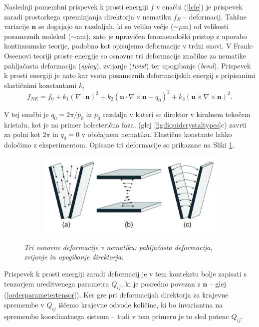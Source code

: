 \documentclass[longbibliography,slovene,a4paper,12pt]{book}
\begin{document}
Naslednji pomembni prispevek k prosti energiji $f$ v enačbi (\ref{lcfe}) je prispevek zaradi prostorkega spreminjanja direktorja v nematiku $f_{E}$ -- deformacij. Takšne variacije $\mathbf{n}$ se dogajajo na razdaljah, ki so veliko večje ($\sim \mu$m) od velikosti posameznih molekul ($\sim $nm), zato je upravičen fenomenološki pristop z uporabo kontinuumske teorije, podobno kot opisujemo deformacije v trdni snovi. V Frank-Oseenovi teoriji proste energije so osnovne tri deformacije značilne za nematike  pahljačasta deformacija (\emph{splay}), zvijanje (\emph{twist}) ter upogibanje (\emph{bend}). Prispevek k prosti energiji je nato kar vsota posameznih deformacijskih energij s pripisanimi elastičnimi konstantami $k_i$
\begin{equation}
f_{NE} = f_0 + k_1 (\nabla \cdot \mathbf{n})^2 + k_2(\mathbf{n} \cdot \nabla \times \mathbf{n} - q_0)^2 + k_3 (\mathbf{n} \times \nabla \times \mathbf{n})^2.
\label{frankfe}
\end{equation}

V tej enačbi je $q_0 = 2\pi /p_0$ in $p_0$ razdalja v kateri se direktor v kiralnem tekočem kristalu, kot je na primer holesterična faza, (glej \ref{fig:liquidcrystaltypes}c) zavrti za polni kot $2\pi$ in $q_0 = 0$ v običajnem nematiku. Elastične konstante lahko določimo z eksperimentom. Opisane tri deformacije so prikazane na Sliki \ref{fig:lcdeformations}. 
\begin{figure}[h!]
	\centering
	\begin{subfigure}[b]{0.7\textwidth}
	\includegraphics[width=\textwidth]{slike/lc_deformations.png}
	\end{subfigure}
	\caption{\emph{Tri osnovne deformacije v nematiku: pahljačasta deformacija, zvijanje in upogibanje direktorja.}}
	\label{fig:lcdeformations}
\end{figure}

Prispevek k prosti energiji zaradi deformacij je v tem kontekstu bolje zapisati s tenzorjem ureditvenega parametra $Q_{ij}$, ki je posredno povezan z $\mathbf{n}$ -- glej (\ref{orderparametertensor}). Ker gre pri deformacijah direktorja za krajevne spremembe v $Q_{ij}$ iščemo krajevne odvode količine, ki bo invariantna na spremembo koordinatnega sistema -- tudi v tem primeru je to sled potenc $Q_{ij}$. 
\end{document}
